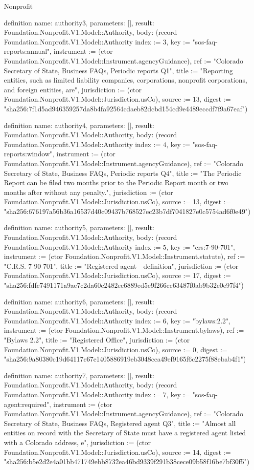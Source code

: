 \begin{lexlean}{Nonprofit}
\begin{semanticmodule}
definition{
  name: authority3,
  parameters: [],
  result: Foundation.Nonprofit.V1.Model::Authority,
  body: (record Foundation.Nonprofit.V1.Model::Authority {index := 3, key := "sos-faq-reports:annual", instrument := (ctor Foundation.Nonprofit.V1.Model::Instrument.agencyGuidance), ref := "Colorado Secretary of State, Business FAQs, Periodic reports Q1", title := "Reporting entities, such as limited liability companies, corporations, nonprofit corporations, and foreign entities, are", jurisdiction := (ctor Foundation.Nonprofit.V1.Model::Jurisdiction.usCo), source := 13, digest := "sha256:7f1d5ad946359257da8b4fa92564cdaeb82dcbd154cd9e4489eccdf7f9a67eaf"})
}

definition{
  name: authority4,
  parameters: [],
  result: Foundation.Nonprofit.V1.Model::Authority,
  body: (record Foundation.Nonprofit.V1.Model::Authority {index := 4, key := "sos-faq-reports:window", instrument := (ctor Foundation.Nonprofit.V1.Model::Instrument.agencyGuidance), ref := "Colorado Secretary of State, Business FAQs, Periodic reports Q4", title := "The Periodic Report can be filed two months prior to the Periodic Report month or two months after without any penalty.", jurisdiction := (ctor Foundation.Nonprofit.V1.Model::Jurisdiction.usCo), source := 13, digest := "sha256:676197a56b36a16537d40c09437b768527ec23b7df7041827e0c5754ad6f0e49"})
}

definition{
  name: authority5,
  parameters: [],
  result: Foundation.Nonprofit.V1.Model::Authority,
  body: (record Foundation.Nonprofit.V1.Model::Authority {index := 5, key := "crs:7-90-701", instrument := (ctor Foundation.Nonprofit.V1.Model::Instrument.statute), ref := "C.R.S. 7-90-701", title := "Registered agent - definition", jurisdiction := (ctor Foundation.Nonprofit.V1.Model::Jurisdiction.usCo), source := 17, digest := "sha256:fdfe7491171a9ae7c2da60c2482ec6889ed5e9f266cc63487f0ab9b32e0e97f4"})
}

definition{
  name: authority6,
  parameters: [],
  result: Foundation.Nonprofit.V1.Model::Authority,
  body: (record Foundation.Nonprofit.V1.Model::Authority {index := 6, key := "bylaws:2.2", instrument := (ctor Foundation.Nonprofit.V1.Model::Instrument.bylaws), ref := "Bylaws 2.2", title := "Registered Office", jurisdiction := (ctor Foundation.Nonprofit.V1.Model::Jurisdiction.usCo), source := 0, digest := "sha256:9a80380c19d64117c67c1405886919eb3048cea49ef9165f6c2275f88ebab4f1"})
}

definition{
  name: authority7,
  parameters: [],
  result: Foundation.Nonprofit.V1.Model::Authority,
  body: (record Foundation.Nonprofit.V1.Model::Authority {index := 7, key := "sos-faq-agent:required", instrument := (ctor Foundation.Nonprofit.V1.Model::Instrument.agencyGuidance), ref := "Colorado Secretary of State, Business FAQs, Registered agent Q3", title := "Almost all entities on record with the Secretary of State must have a registered agent listed with a Colorado address, e", jurisdiction := (ctor Foundation.Nonprofit.V1.Model::Jurisdiction.usCo), source := 14, digest := "sha256:b5e2d2e4a01bb471749ebb8732ea46bd9339f291b38cece09b58f16be7bf30f5"})
}


\end{semanticmodule}
\end{lexlean}
